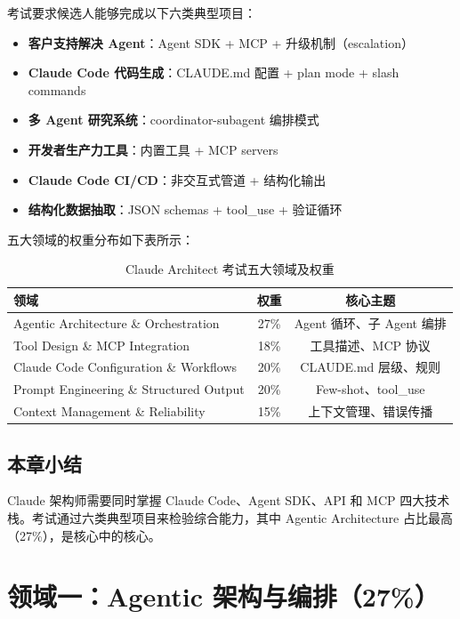 \documentclass[a4paper]{article}
\begin{document}
考试要求候选人能够完成以下六类典型项目：

\begin{itemize}[leftmargin=1.5em]
    \item \textbf{客户支持解决 Agent}：Agent SDK + MCP + 升级机制（escalation）
    \item \textbf{Claude Code 代码生成}：CLAUDE.md 配置 + plan mode + slash commands
    \item \textbf{多 Agent 研究系统}：coordinator-subagent 编排模式
    \item \textbf{开发者生产力工具}：内置工具 + MCP servers
    \item \textbf{Claude Code CI/CD}：非交互式管道 + 结构化输出
    \item \textbf{结构化数据抽取}：JSON schemas + tool\_use + 验证循环
\end{itemize}

五大领域的权重分布如下表所示：

\begin{table}[H]
\centering
\begin{tabular}{lcc}
\toprule
\textbf{领域} & \textbf{权重} & \textbf{核心主题} \\
\midrule
Agentic Architecture \& Orchestration & 27\% & Agent 循环、子 Agent 编排 \\
Tool Design \& MCP Integration & 18\% & 工具描述、MCP 协议 \\
Claude Code Configuration \& Workflows & 20\% & CLAUDE.md 层级、规则 \\
Prompt Engineering \& Structured Output & 20\% & Few-shot、tool\_use \\
Context Management \& Reliability & 15\% & 上下文管理、错误传播 \\
\bottomrule
\end{tabular}
\caption{Claude Architect 考试五大领域及权重}
\end{table}

\subsection{本章小结}

Claude 架构师需要同时掌握 Claude Code、Agent SDK、API 和 MCP 四大技术栈。考试通过六类典型项目来检验综合能力，其中 Agentic Architecture 占比最高（27\%），是核心中的核心。

\section{领域一：Agentic 架构与编排（27\%）}
\end{document}
